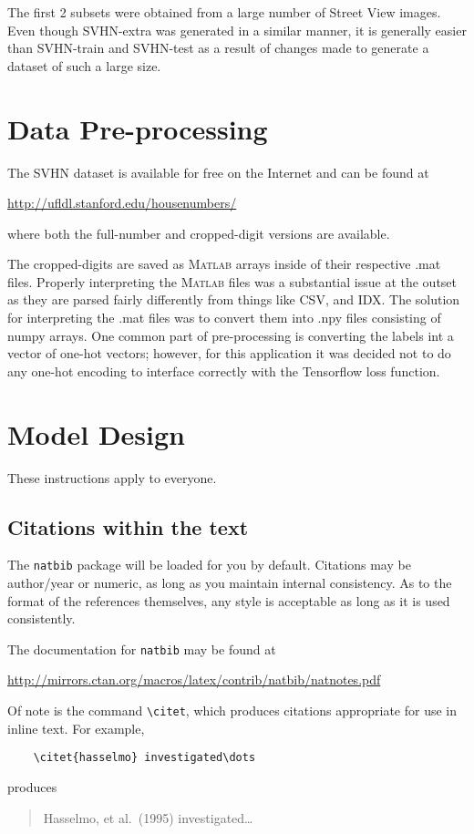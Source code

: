 \documentclass{article}
\newcommand{\MATLAB}{\textsc{Matlab}\xspace}
\begin{document}
	The first 2 subsets were obtained from a large number of Street View images. Even though SVHN-extra was generated in a similar manner, it is generally easier than SVHN-train and SVHN-test as a result of changes made to generate a dataset of such a large size.
	
	
	\section{Data Pre-processing}
	\label{pre-proc}
		
	The SVHN dataset is available for free on the Internet and can be found at
	\begin{center}
		\url{http://ufldl.stanford.edu/housenumbers/}
	\end{center}
	where both the full-number and cropped-digit versions are available.
	
	The cropped-digits are saved as \MATLAB arrays inside of their respective .mat files. Properly interpreting the \MATLAB files was a substantial issue at the outset as they are parsed fairly differently from things like CSV, and IDX.  The solution for interpreting the .mat files was to convert them into .npy files consisting of numpy arrays. One common part of pre-processing is converting the labels int a vector of one-hot vectors; however, for this application it was decided not to do any one-hot encoding 
	to interface correctly with the Tensorflow loss function.

	\section{Model Design}
	\label{model}
	
	These instructions apply to everyone.
	
	\subsection{Citations within the text}
	
	The \verb+natbib+ package will be loaded for you by default.
	Citations may be author/year or numeric, as long as you maintain
	internal consistency.  As to the format of the references themselves,
	any style is acceptable as long as it is used consistently.
	
	The documentation for \verb+natbib+ may be found at
	\begin{center}
		\url{http://mirrors.ctan.org/macros/latex/contrib/natbib/natnotes.pdf}
	\end{center}
	Of note is the command \verb+\citet+, which produces citations
	appropriate for use in inline text.  For example,
	\begin{verbatim}
	\citet{hasselmo} investigated\dots
	\end{verbatim}
	produces
	\begin{quote}
		Hasselmo, et al.\ (1995) investigated\dots
	\end{quote}
	
\end{document}

